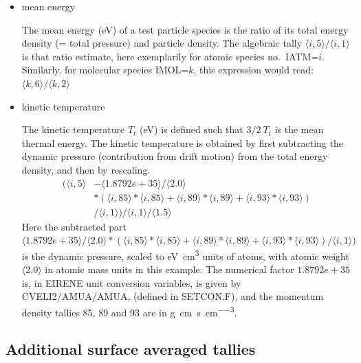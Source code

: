 \begin{itemize}
  \item{mean energy} ~ 

        The mean energy (\si{\electronvolt}) of a test particle species is the ratio of
        its total energy density (= total pressure) and particle density.
        The algebraic tally $\langle i,5\rangle/\langle i,1\rangle$ is that ratio
        estimate, here exemplarily for atomic species no.\ IATM=$i$.
        Similarly, for molecular species IMOL=$k$, this expression would read:
        $\langle k,6\rangle/\langle k,2\rangle$ 

  \item{kinetic temperature} ~ 

        The kinetic temperature $T_t$ (\si{\electronvolt})  is defined such that $3/2
          \ T_t$ is the mean thermal energy.
        The kinetic temperature is obtained by first subtracting the dynamic pressure
        (contribution from drift motion) from the total energy density, and then by
        rescaling.
        \begin{align}
          \nonumber
          (\langle i,5\rangle & -\langle 1.8792e+35\rangle/\langle 2.0\rangle
          \\
                              & *(\langle i,85 \rangle*\langle
          i,85\rangle+\langle i,89\rangle*\langle i,89\rangle+\langle i,93\rangle*\langle
          i,93\rangle)                                                          \\
                              & /\langle i,1\rangle)/\langle i,1\rangle/\langle
          1.5\rangle
        \end{align}
        Here the subtracted part $\langle 1.8792e+35\rangle/\langle 2.0\rangle*
          (\langle i,85\rangle*\langle i,85\rangle+ \langle i,89\rangle*\langle
          i,89\rangle+ \langle i,93\rangle*\langle i,93\rangle)/ \langle i,1\rangle)$ is
        the dynamic pressure, scaled to \si{\electronvolt\cubic\centi\metre} units of
        atoms, with atomic weight $\langle 2.0\rangle$ in atomic mass units in this
        example.
        The numerical factor $1.8792e+35$ is, in EIRENE unit conversion variables, is
        given by CVELI2/AMUA/AMUA, (defined in SETCON.F), and the momentum density
        tallies 85, 89 and 93 are in
        \si{\gram\centi\metre\per\second\per\cubic\centi\metre}.
\end{itemize}

\subsection{Additional surface averaged tallies}\label{sec2.10E}

